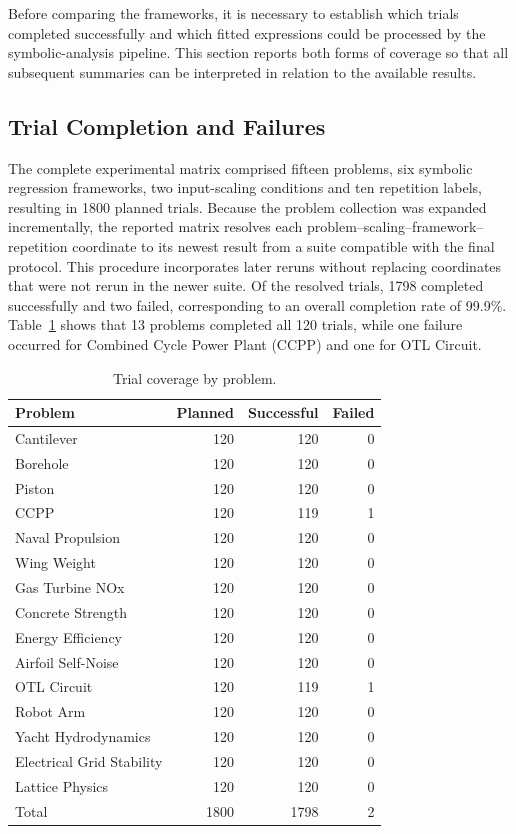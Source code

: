 \documentclass[12pt,oneside,bibtotoc,liststotoc]{scrbook}
\begin{document}
Before comparing the frameworks, it is necessary to establish which trials completed successfully and which fitted expressions could be processed by the symbolic-analysis pipeline. This section reports both forms of coverage so that all subsequent summaries can be interpreted in relation to the available results.

\subsection{Trial Completion and Failures}

The complete experimental matrix comprised fifteen problems, six symbolic regression frameworks, two input-scaling conditions and ten repetition labels, resulting in 1800 planned trials. Because the problem collection was expanded incrementally, the reported matrix resolves each problem--scaling--framework--repetition coordinate to its newest result from a suite compatible with the final protocol. This procedure incorporates later reruns without replacing coordinates that were not rerun in the newer suite. Of the resolved trials, 1798 completed successfully and two failed, corresponding to an overall completion rate of 99.9\%. Table~\ref{tab:results-trial-coverage} shows that 13 problems completed all 120 trials, while one failure occurred for Combined Cycle Power Plant (CCPP) and one for OTL Circuit.

\begin{table}[H]
    \centering
    \caption{Trial coverage by problem.}
    \label{tab:results-trial-coverage}
    \begin{tabular}{lrrr}
        \toprule
        Problem & Planned & Successful & Failed \\
        \midrule
        Cantilever & 120 & 120 & 0 \\
        Borehole & 120 & 120 & 0 \\
        Piston & 120 & 120 & 0 \\
        CCPP & 120 & 119 & 1 \\
        Naval Propulsion & 120 & 120 & 0 \\
        Wing Weight & 120 & 120 & 0 \\
        Gas Turbine NOx & 120 & 120 & 0 \\
        Concrete Strength & 120 & 120 & 0 \\
        Energy Efficiency & 120 & 120 & 0 \\
        Airfoil Self-Noise & 120 & 120 & 0 \\
        OTL Circuit & 120 & 119 & 1 \\
        Robot Arm & 120 & 120 & 0 \\
        Yacht Hydrodynamics & 120 & 120 & 0 \\
        Electrical Grid Stability & 120 & 120 & 0 \\
        Lattice Physics & 120 & 120 & 0 \\
        \midrule
        Total & 1800 & 1798 & 2 \\
        \bottomrule
    \end{tabular}
\end{table}
\end{document}

